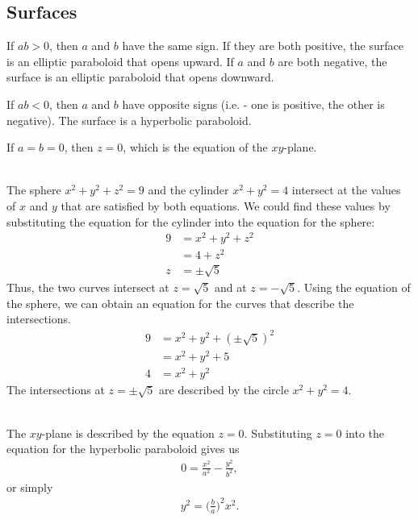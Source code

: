 \subsection{Surfaces}
\BEN
\item {}
\BEN
\item If $ab > 0$, then $a$ and $b$ have the same sign. If they are both positive, the surface is an elliptic paraboloid that opens upward. If $a$ and $b$ are both negative, the surface is an elliptic paraboloid that opens downward. 
\item If $ab < 0$, then $a$ and $b$ have opposite signs (i.e. - one is positive, the other is negative). The surface is a hyperbolic paraboloid.
\item If $a=b = 0$, then $z=0$, which is the equation of the $xy$-plane. 
\EEN
\item {}\\
The sphere $x^2+y^2+z^2 =9$ and the cylinder $x^2+y^2 =4$ intersect at the values of $x$ and $y$ that are satisfied by both equations. We could find these values by substituting the equation for the cylinder into the equation for the sphere:
\begin{align*}
  9 
  &= x^2+y^2+z^2 \\
  &= 4+z^2 \\
  z&=\pm\sqrt{5}
\end{align*}
Thus, the two curves intersect at $z=\sqrt{5}$ and at $z=-\sqrt{5}$. Using the equation of the sphere, we can obtain an equation for the curves that describe the intersections.
\begin{align*}
  9 
  &= x^2+y^2+(\pm\sqrt{5})^2 \\
  &= x^2+y^2+5 \\
  4&= x^2+y^2 
\end{align*}
The intersections at $z=\pm\sqrt{5}$ are described by the circle $x^2+y^2 =4$. 
\item
{}\\
The $xy$-plane is described by the equation $z=0$. Substituting $z=0$ into the equation for the hyperbolic paraboloid gives us 
\begin{align*} 0 = \frac{x^2}{a^2} - \frac{y^2}{b^2}, \end{align*}
or simply 
\begin{align*}  y^2 = \Big(\frac{b}{a}\Big)^2x^2. \end{align*}
